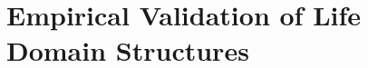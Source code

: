 %
%
%
%
%

\chapter{Empirical Validation of Life Domain Structures}
\label{app:method-bj}

\begin{abstract}
This appendix provides systematic analysis and documentation relevant to the
Evidence-Based Framework (EBF). It integrates with the 10C CORE architecture
and provides validated findings for practical application.
\end{abstract}

\label{app:domainval}



